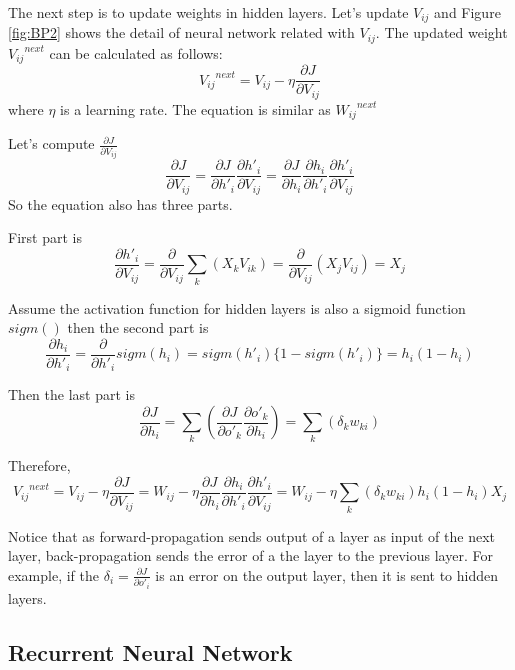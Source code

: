 \documentclass[draft,dvipsnames]{drexel-thesis}
\begin{document}
\begin{thesis}
The next step is to update weights in hidden layers. Let's update $V_{ij}$ and Figure \ref{fig:BP2} shows the detail of neural network related with $V_{ij}$. The updated weight ${{V_{ij}}^{next}}$ can be calculated as follows:
$${{V_{ij}}^{next}}=V_{ij} - \eta\frac{\partial J}{\partial V_{ij}}$$ where $\eta$ is a learning rate. The equation is similar as ${{W_{ij}}^{next}}$

Let's compute $\frac{\partial J}{\partial V_{ij}}$
$$
\frac{\partial J}{\partial V_{ij}}
= \frac{\partial J}{\partial h'_i}\frac{\partial h'_i}{\partial V_{ij}}
= \frac{\partial J}{\partial h_i}\frac{\partial h_i}{\partial h'_i}\frac{\partial h'_i}{\partial V_{ij}}
$$
So the equation also has three parts.

First part is
$$
\frac{\partial h'_i}{\partial V_{ij}}
= \frac{\partial}{\partial V_{ij}}\sum_k(X_kV_{ik})
= \frac{\partial}{\partial V_{ij}}(X_jV_{ij})
= X_j
$$

Assume the activation function for hidden layers is also a sigmoid function $sigm()$ then the second part is
$$
\frac{\partial h_i}{\partial h'_i}
= \frac{\partial}{\partial h'_i}sigm(h_i)
= sigm(h'_i)\{1-sigm(h'_i)\}
= h_i(1-h_i)
$$

Then the last part is
$$
\frac{\partial J}{\partial h_i}
= \sum_k(\frac{\partial J}{\partial o'_k}\frac{\partial o'_k}{\partial h_i})
= \sum_k(\delta_kw_{ki})
$$

Therefore,
$$
{{V_{ij}}^{next}}
= V_{ij} - \eta\frac{\partial J}{\partial V_{ij}}
= W_{ij} - \eta\frac{\partial J}{\partial h_i}\frac{\partial h_i}{\partial h'_i}\frac{\partial h'_i}{\partial V_{ij}}
= W_{ij} - \eta\sum_k(\delta_kw_{ki})h_i(1-h_i)X_j
$$

Notice that as forward-propagation sends output of a layer as input of the next layer, back-propagation sends the error of a the layer to the previous layer. For example, if the $\delta_i=\frac{\partial J}{\partial o'_i}$ is an error on the output layer, then it is sent to hidden layers.




\subsection{Recurrent Neural Network}\label{subsec:RNN}


\end{thesis}
\end{document}
